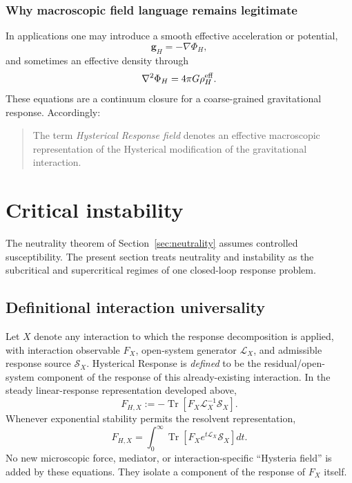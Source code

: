 \documentclass[11pt]{article}
\theoremstyle{definition}
\theoremstyle{remark}
\newcommand{\Tr}{\operatorname{Tr}}
\begin{document}
\subsubsection{Why macroscopic field language remains legitimate}
In applications one may introduce a smooth effective acceleration or potential,
\begin{equation}
 \mathbf g_H=-\nabla\Phi_H,
\end{equation}
and sometimes an effective density through
\begin{equation}
 \nabla^2\Phi_H=4\pi G\rho_H^{\rm eff}.
\end{equation}
These equations are a continuum closure for a coarse-grained gravitational response.  Accordingly:
\begin{quote}
The term \emph{Hysterical Response field} denotes an effective macroscopic representation of the Hysterical modification of the gravitational interaction.
\end{quote}

\section{Critical instability}
\label{sec:instability}
The neutrality theorem of Section~\ref{sec:neutrality} assumes controlled susceptibility.
The present section treats neutrality and instability as the subcritical and supercritical regimes of one closed-loop response problem.
\subsection{Definitional interaction universality}\label{sec:defuniv}
Let $X$ denote any interaction to which the response decomposition is applied, with interaction observable $F_X$, open-system generator $\mathcal L_X$, and admissible response source $\mathcal S_X$. Hysterical Response is \emph{defined} to be the residual/open-system component of the response of this already-existing interaction. In the steady linear-response representation developed above,
\begin{equation}
 \boxed{F_{H,X}:=-\Tr\!\left[F_X\mathcal L_X^{-1}\mathcal S_X\right].}
 \label{eq:defHX}
\end{equation}
Whenever exponential stability permits the resolvent representation,
\begin{equation}
 F_{H,X}=\int_0^\infty \Tr\!\left[F_X e^{t\mathcal L_X}\mathcal S_X\right]dt.
 \label{eq:defHXtime}
\end{equation}
No new microscopic force, mediator, or interaction-specific ``Hysteria field'' is added by these equations. They isolate a component of the response of $F_X$ itself.
\end{document}
